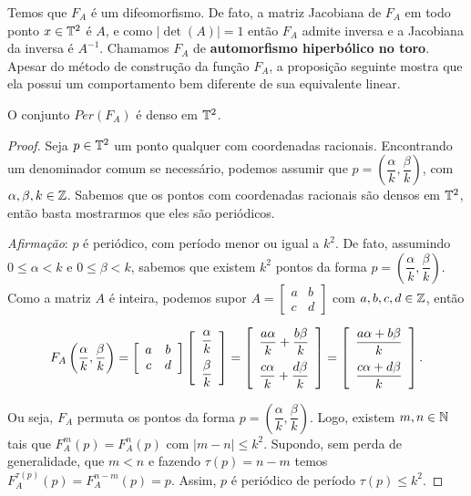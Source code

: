 Temos que $F_A$ é um difeomorfismo. De fato, a matriz Jacobiana de $F_A$ em todo ponto $x\in\mathbb{T}^2$ é $A$, e como $|\det(A)|=1$ então $F_A$ admite inversa e a Jacobiana da inversa é $A^{-1}$. Chamamos $F_A$ de \textbf{automorfismo hiperbólico no toro}. Apesar do método de construção da função $F_A$, a proposição seguinte mostra que ela possui um comportamento bem diferente de sua equivalente linear.

\begin{proposicao} O conjunto $Per(F_A)$ é denso em $\mathbb{T}^2$.
\end{proposicao}

\begin{proof} Seja $p\in\mathbb{T}^2$ um ponto qualquer com coordenadas racionais. Encontrando um denominador comum se necessário, podemos assumir que $p=\left(\dfrac{\alpha}{k},\dfrac{\beta}{k}\right)$, com $\alpha,\beta,k\in\mathbb{Z}$. Sabemos que os pontos com coordenadas racionais são densos em $\mathbb{T}^2$, então basta mostrarmos que eles são periódicos.

\textit{Afirmação}: $p$ é periódico, com período menor ou igual a $k^2$. De fato, assumindo $0\leq \alpha<k$ e $0\leq \beta<k$, sabemos que existem $k^2$ pontos da forma $p=\left(\dfrac{\alpha}{k},\dfrac{\beta}{k}\right)$. Como a matriz $A$ é inteira, podemos supor $A=\left[\begin{array}{cc}a & b\\ c & d\end{array}\right]$ com $a,b,c,d\in\mathbb{Z}$, então

\begin{equation*}
F_A\left(\dfrac{\alpha}{k},\dfrac{\beta}{k}\right)=\left[\begin{array}{cc}a & b\\ c & d\end{array}\right]\left[\begin{array}{c}\dfrac{\alpha}{k}\vspace{0.2cm}\\\dfrac{\beta}{k}\end{array}\right]=\left[\begin{array}{c}\dfrac{a\alpha}{k}+\dfrac{b\beta}{k}\vspace{0.2cm}\\ \dfrac{c\alpha}{k}+\dfrac{d\beta}{k}\end{array}\right]=\left[\begin{array}{c}\dfrac{a\alpha+b\beta}{k}\vspace{0.2cm}\\ \dfrac{c\alpha+d\beta}{k}\end{array}\right].
\end{equation*}

Ou seja, $F_A$ permuta os pontos da forma $p=\left(\dfrac{\alpha}{k},\dfrac{\beta}{k}\right)$. Logo, existem $m,n\in\mathbb{N}$ tais que $F_A^m(p)=F_A^n(p)$ com $|m-n|\leq k^2$. Supondo, sem perda de generalidade, que $m<n$ e fazendo $\tau(p)=n-m$ temos $F_A^{\tau(p)}(p)=F_A^{n-m}(p)=p$. Assim, $p$ é periódico de período $\tau(p)\leq k^2$.
\end{proof}

